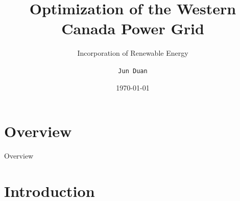 \documentclass[newPxFont,numfooter,progressbar,sectionpages]{beamer}
\title[Incorporation of Renewable Energy]{Optimization of the Western Canada Power Grid}
\subtitle{Incorporation of Renewable Energy}
\date{\today}
\author{\texttt{Jun Duan}}
\begin{document}
	
	
	\maketitle
	
	
	
	
	
	
	
	
	\section*{Overview}
	\begin{frame}{Overview}
	\tableofcontents
\end{frame}

%
%

\section{Introduction}

\end{document}
